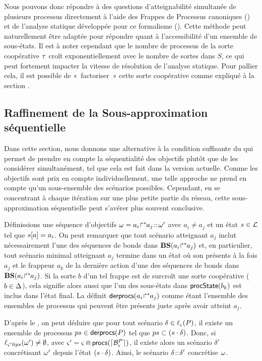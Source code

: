 Nous pouvons donc répondre à des questions d'atteignabilité simultanée de plusieurs processus
directement à l'aide des Frappes de Processus canoniques ()
et de l'analyse statique développée pour ce formalisme ().
Cette méthode peut naturellement être adaptée pour répondre quant à
l'accessibilité d'un ensemble de sous-états.
Il est à noter cependant que le nombre de processus de la sorte coopérative $\tau$
croît exponentiellement avec le nombre de sortes dans $S$, ce qui peut fortement impacter
la vitesse de résolution de l'analyse statique.
Pour pallier cela, il est possible de «~factoriser~» cette sorte coopérative comme expliqué
à la section \toref.



\subsection{Raffinement de la Sous-approximation séquentielle}

Dans cette section, nous donnons une alternative à la condition suffisante du 
qui permet de prendre en compte la séquentialité des objectifs plutôt que de les considérer
simultanément, tel que cela est fait dans la version actuelle.
Comme les objectifs sont prix en compte individuellement, une telle approche ne prend en compte
qu'un sous-ensemble des scénarios possibles.
Cependant, en se concentrant à chaque itération sur une plus petite partie du réseau, 
cette sous-approximation séquentielle peut s'avérer plus souvent conclusive.

Définissions une séquence d'objectifs $\omega = {a_i\!\Rsh^*\!\!a_j} \!::\! \omega'$ avec
$a_i \neq a_j$ et un état $s \in \mathcal{L}$ tel que $s[{a}] = a_i$.
On peut remarquer que tout scénario atteignant $a_j$ inclut nécessairement l'une des séquences
de bonds dans $\mathbf{BS}({a_i\!\Rsh^*\!\!a_j})$ et, en particulier,
tout scénario minimal atteignant $a_j$ termine dans un état où son présents à la fois
$a_j$ et le frappeur $a_k$ de la dernière action d'une des séquences de bonds
dans $\mathbf{BS}({a_i\!\Rsh^*\!\!a_j})$.
Si la sorte $b$ d'un tel frappe est de surcroît une sorte coopérative ($b \in \Delta$),
cela signifie alors aussi que l'un des sous-états dans $\mathsf{procState}(b_k)$
est inclus dans l'état final.
La  définit $\mathsf{derprocs}({a_i\!\Rsh^*\!\!a_j})$ comme étant l'ensemble des ensembles
de processus qui peuvent être présents juste après avoir atteint $a_j$.

D'après le , on peut déduire que pour tout scénario $\delta \in \ell_\varsigma(P)$,
il existe un ensemble de processus $ps \in \mathsf{derprocs}(P)$ tel que $ps \subset (s \cdot \delta)$.
Donc, si $\ell_{\varsigma' \Cap ps}(\omega') \neq \emptyset$,
avec $\varsigma' = \varsigma \Cap \mathsf{procs}(\lceil \mathcal{B}_{\varsigma}^{P}\rceil)$,
il existe alors un scénario $\delta'$ concrétisant $\omega'$ depuis l'état $(s \cdot \delta)$.
Ainsi, le scénario  $\delta \!::\! \delta'$ concrétise $\omega$.


